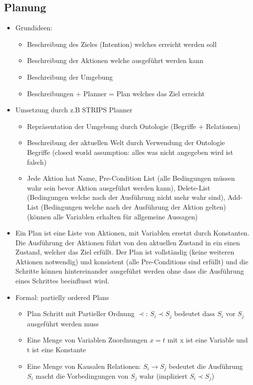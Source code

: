 \documentclass{article} %
\begin{document}
	\subsection{Planung}
	\begin{itemize}
		\item Grundideen:
		\begin{itemize}
			\item Beschreibung des Zieles (Intention) welches erreicht werden soll
			\item Beschreibung der Aktionen welche ausgeführt werden kann
			\item Beschreibung der Umgebung
			\item Beschreibungen + Planner = Plan welches das Ziel erreicht
		\end{itemize}
		\item Umsetzung durch z.B STRIPS Planner
		\begin{itemize}
			\item Repräsentation der Umgebung durch Ontologie (Begriffe + Relationen)
			\item Beschreibung der aktuellen Welt durch Verwendung der Ontologie Begriffe (closed world assumption: alles was nicht angegeben wird ist falsch)
			\item Jede Aktion hat Name, Pre-Condition List (alle Bedingungen müssen wahr sein bevor Aktion ausgeführt werden kann), Delete-List (Bedingungen welche nach der Ausführung nicht mehr wahr sind), Add-List (Bedingungen welche nach der Ausführung der Aktion gelten) (können alle Variablen erhalten für allgemeine Aussagen)
		\end{itemize}
		\item Ein Plan ist eine Liste von Aktionen, mit Variablen ersetzt durch Konstanten. Die Ausführung der Aktionen führt von den aktuellen Zustand in ein einen Zustand, welcher das Ziel erfüllt. Der Plan ist vollständig (keine weiteren Aktionen notwendig) und konsistent (alle Pre-Conditions sind erfüllt) und die Schritte können hintereinander ausgeführt werden ohne dass die Ausführung eines Schrittes beeinflusst wird.
		\item Formal: partielly ordered Plans
		\begin{itemize}
			\item Plan Schritt mit Partieller Ordnung $\prec$: $S_{i} \prec S_{j}$ bedeutet dass $S_{i}$ vor $S_{j}$ ausgeführt werden muss
			\item Eine Menge von Variablen Zuordnungen $x=t$ mit x ist eine Variable und t ist eine Konstante
			\item Eine Menge von Kausalen Relationen: $S_{i} \rightarrow S_{j}$ bedeutet die Ausführung $S_{i}$ macht die Vorbedingungen von $S_{j}$ wahr (impliziert  $S_{i} \prec S_{j}$)

\end{itemize}
\end{itemize}
\end{document}
